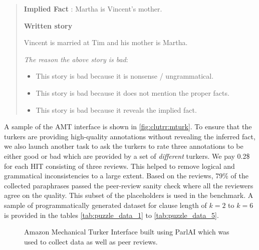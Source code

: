 \documentclass[letterpaper, 12pt]{report}
\begin{document}
\begin{quote}
    \textbf{Implied Fact} : Martha is Vincent's mother.

    \textbf{Written story}

    Vincent is married at Tim and his mother is Martha.

    \textit{The reason the above story is bad}:

    \begin{itemize}
        \item This story is bad because it is nonsense / ungrammatical.
        \item This story is bad because it does not mention the proper facts.
        \item This story is bad because it reveals the implied fact.
    \end{itemize}
\end{quote}

A sample of the AMT interface is shown in \autoref{fig:clutrr:mturk}.
To ensure that the turkers are providing high-quality annotations without revealing the inferred fact, we also launch another task to ask the turkers to rate three annotations to be either good or bad which are provided by a set of \textit{different} turkers. We pay 0.2\$ for each HIT consisting of three reviews. This helped to remove logical and grammatical inconsistencies to a large extent. Based on the reviews, 79\% of the collected paraphrases passed the peer-review sanity check where all the reviewers agree on the quality. This subset of the placeholders is used in the benchmark. A sample of programmatically generated dataset for clause length of $k=2$ to $k=6$ is provided in the tables \ref{tab:puzzle_data_1} to \ref{tab:puzzle_data_5}.

\begin{figure}[h]
  \centering
    \caption{Amazon Mechanical Turker Interface built using ParlAI which was used to collect data as well as peer reviews.}%
    \label{fig:clutrr:mturk}
\end{figure}
\end{document}
